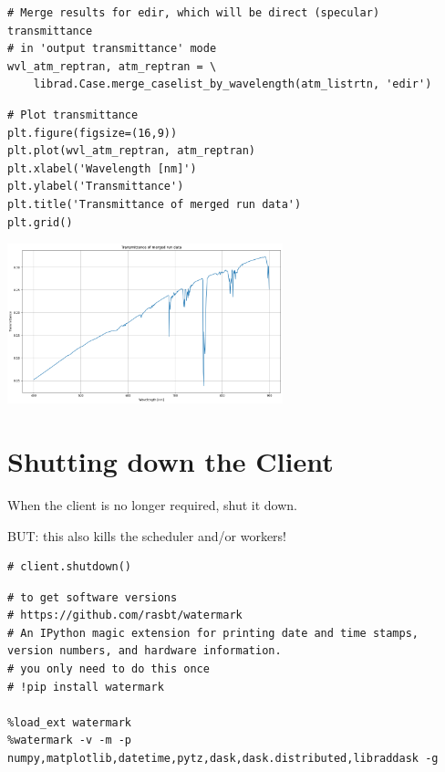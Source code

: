 \begin{lstlisting}[style=incellstyle]
# Merge results for edir, which will be direct (specular) transmittance 
# in 'output transmittance' mode
wvl_atm_reptran, atm_reptran = \
    librad.Case.merge_caselist_by_wavelength(atm_listrtn, 'edir')

\end{lstlisting}


\begin{lstlisting}[style=tinysize]
# Plot transmittance
plt.figure(figsize=(16,9))
plt.plot(wvl_atm_reptran, atm_reptran)
plt.xlabel('Wavelength [nm]')
plt.ylabel('Transmittance')
plt.title('Transmittance of merged run data')
plt.grid()

\end{lstlisting}

\begin{center}
\includegraphics[width=0.6\textwidth]{./pic/libraddaskTemplate_28_0.png}
\end{center}


\section{Shutting down the Client}
\label{sec:ShuttingdowntheClient}

When the client is no longer required, shut it down.


BUT: this also kills the scheduler and/or workers!



\begin{lstlisting}[style=tinysize]
# client.shutdown()
\end{lstlisting}


\begin{lstlisting}[style=tinysize]
# to get software versions
# https://github.com/rasbt/watermark
# An IPython magic extension for printing date and time stamps, version numbers, and hardware information. 
# you only need to do this once
# !pip install watermark

%load_ext watermark
%watermark -v -m -p numpy,matplotlib,datetime,pytz,dask,dask.distributed,libraddask -g 
\end{lstlisting}


